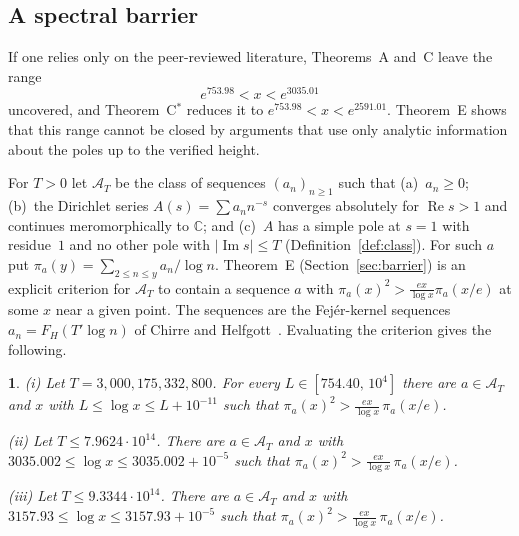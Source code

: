 \documentclass{amsart}
\theoremstyle{definition}
\theoremstyle{remark}
\theoremstyle{plain}
\newcommand{\lettername}{}
\newtheorem*{letteredthm*}{\lettername}
\newenvironment{lcor}[1]{\renewcommand{\lettername}{Corollary #1}\begin{letteredthm*}}{\end{letteredthm*}}
\numberwithin{equation}{section}
\newcommand{\HRH}{3{,}000{,}175{,}332{,}800}
\newcommand{\cA}{\mathcal{A}}
\newcommand{\Cstar}{C$^*$}
\begin{document}
\subsection{A spectral barrier}
If one relies only on the peer-reviewed literature, Theorems~A and~C leave the range
\[
e^{753.98}<x<e^{3035.01}
\]
uncovered, and Theorem~\Cstar{} reduces it to $e^{753.98}<x<e^{2591.01}$. Theorem~E shows that this range cannot be closed by arguments that use only analytic information about the poles up to the verified height.

For $T>0$ let $\cA_T$ be the class of sequences $(a_n)_{n\ge1}$ such that (a)~$a_n\ge0$; (b)~the Dirichlet series $A(s)=\sum a_nn^{-s}$ converges absolutely for $\operatorname{Re}s>1$ and continues meromorphically to $\mathbb C$; and (c)~$A$ has a simple pole at $s=1$ with residue~$1$ and no other pole with $|\operatorname{Im}s|\le T$ (Definition~\ref{def:class}). For such $a$ put $\pi_a(y)=\sum_{2\le n\le y}a_n/\log n$. Theorem~E (Section~\ref{sec:barrier}) is an explicit criterion for $\cA_T$ to contain a sequence $a$ with $\pi_a(x)^2>\frac{ex}{\log x}\pi_a(x/e)$ at some $x$ near a given point. The sequences are the Fej\'er-kernel sequences $a_n=F_H(T'\log n)$ of Chirre and Helfgott~\cite[Prop.~3.1]{CH25}. Evaluating the criterion gives the following.

\begin{lcor}{E}
\textup{(i)} Let $T=\HRH$. For every $L\in[754.40,\,10^4]$ there are $a\in\cA_T$ and $x$ with $L\le\log x\le L+10^{-11}$ such that $\pi_a(x)^2>\frac{ex}{\log x}\,\pi_a(x/e)$.

\textup{(ii)} Let $T\le7.9624\cdot10^{14}$. There are $a\in\cA_T$ and $x$ with $3035.002\le\log x\le3035.002+10^{-5}$ such that $\pi_a(x)^2>\frac{ex}{\log x}\,\pi_a(x/e)$.

\textup{(iii)} Let $T\le9.3344\cdot10^{14}$. There are $a\in\cA_T$ and $x$ with $3157.93\le\log x\le3157.93+10^{-5}$ such that $\pi_a(x)^2>\frac{ex}{\log x}\,\pi_a(x/e)$.
\end{lcor}
\end{document}
